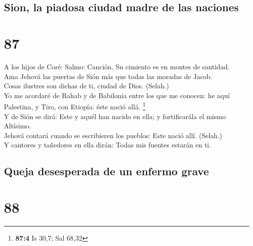 \hypertarget{sion-la-piadosa-ciudad-madre-de-las-naciones}{%
\subsection{Sion, la piadosa ciudad madre de las
naciones}\label{sion-la-piadosa-ciudad-madre-de-las-naciones}}

\hypertarget{section-86}{%
\section{87}\label{section-86}}

 A los hijos de Coré: Salmo: Canción. Su cimiento es en
montes de santidad.\\
 Ama Jehová las puertas de Sión más que todas las moradas de
Jacob.\\
 Cosas ilustres son dichas de ti, ciudad de Dios. (Selah.)\\
 Yo me acordaré de Rahab y de Babilonia entre los que me
conocen: he aquí Palestina, y Tiro, con Etiopía: éste nació allá.
\footnote{\textbf{87:4} Is 30,7; Sal 68,32}\\
 Y de Sión se dirá: Este y aquél han nacido en ella; y
fortificarála el mismo Altísimo.\\
 Jehová contará cuando se escribieren los pueblos: Este
nació allí. (Selah.)\\
 Y cantores y tañedores en ella dirán: Todas mis fuentes
estarán en ti.

\hypertarget{queja-desesperada-de-un-enfermo-grave}{%
\subsection{Queja desesperada de un enfermo
grave}\label{queja-desesperada-de-un-enfermo-grave}}

\hypertarget{section-87}{%
\section{88}\label{section-87}}

